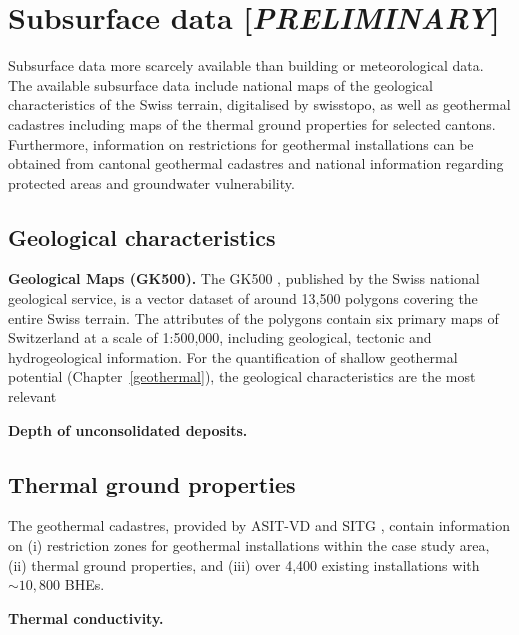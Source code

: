 \section{Subsurface data [\textit{PRELIMINARY}]}
\label{data_geo}

Subsurface data more scarcely available than building or meteorological data. 
The available subsurface data include national maps of the geological characteristics of the Swiss terrain, digitalised by swisstopo, as well as geothermal cadastres including maps of the thermal ground properties for selected cantons.
Furthermore, information on restrictions for geothermal installations can be obtained from cantonal geothermal cadastres and national information regarding protected areas and groundwater vulnerability.

\subsection{Geological characteristics}
\textbf{Geological Maps (GK500).} The GK500 \cite{swisstopo_geomaps_nodate}, published by the Swiss national geological service, is a vector dataset of around 13,500 polygons covering the entire Swiss terrain.
The attributes of the polygons contain six primary maps of Switzerland at a scale of 1:500,000, including geological, tectonic and hydrogeological information. 
For the quantification of shallow geothermal potential (Chapter~\ref{geothermal}), the geological characteristics are the most relevant 

\textbf{Depth of unconsolidated deposits.}

\subsection{Thermal ground properties}

The geothermal cadastres, provided by ASIT-VD \cite{asit_vd_cadastre_2019-1} and SITG \cite{sitg_cadastre_2019}, contain information on (i) restriction zones for geothermal installations within the case study area, (ii) thermal ground properties, and (iii) over 4,400 existing installations with $\sim 10,800$ BHEs.

\textbf{Thermal conductivity.}

